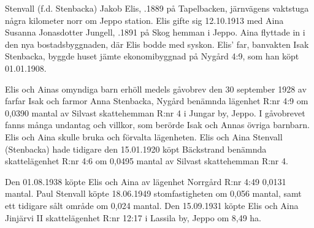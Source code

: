 %
Stenvall (f.d. Stenbacka) Jakob Elis, .1889 på Tapelbacken, järnvägens vaktstuga några kilometer norr om Jeppo station. Elis gifte sig 12.10.1913 med Aina Susanna Jonasdotter Jungell, .1891 på Skog hemman i Jeppo. Aina flyttade in i den nya bostadsbyggnaden, där Elis bodde med syskon.  Elis' far, banvakten Isak Stenbacka, byggde huset jämte ekonomibyggnad på Nygård 4:9, som han köpt 01.01.1908.
\begin{jhchildren}
  \item {}
  \item {}
  \item {}
  \item {}
  \item {}
  \item {}
\end{jhchildren}
Elis och Ainas omyndiga barn erhöll medels gåvobrev den 30 september 1928 av farfar Isak och farmor Anna Stenbacka, Nygård benämnda lägenhet R:nr 4:9 om 0,0390 mantal av Silvast skattehemman R:nr 4 i Jungar by, Jeppo. I gåvobrevet fanns många undantag och villkor, som berörde Isak och Annas övriga barnbarn. Elis och Aina skulle bruka och förvalta lägenheten. Elis och Aina Stenvall (Stenbacka) hade tidigare den 15.01.1920 köpt Bäckstrand benämnda skattelägenhet R:nr 4:6 om 0,0495 mantal av Silvast skattehemman R:nr 4.

Den 01.08.1938 köpte Elis och Aina av lägenhet Norrgård R:nr 4:49  0,0131 mantal. Paul Stenvall köpte 18.06.1949 stomfastigheten om 0,056 mantal, samt ett tidigare sålt område om 0,024 mantal. Den 15.09.1931 köpte Elis och Aina Jinjärvi II skattelägenhet R:nr 12:17 i Lassila by, Jeppo om 8,49 ha.

